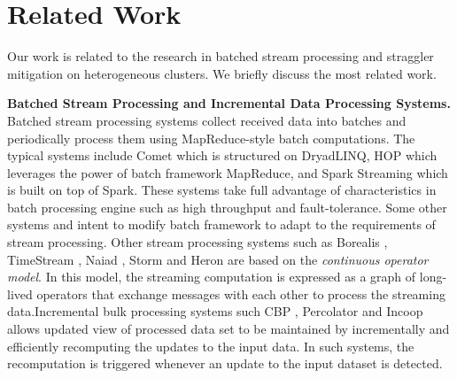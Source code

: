 \documentclass[10pt,conference,compsocconf,letterpaper]{IEEEtran}
\begin{document}
\section{Related Work}

  Our work is related to the research in batched stream processing and straggler mitigation on heterogeneous clusters. We briefly discuss the most related work.

  \textbf{Batched Stream Processing and Incremental Data Processing Systems.} Batched stream processing systems collect received data into batches and periodically process them using MapReduce-style batch computations. The typical systems include Comet \cite{He2010} which is structured on DryadLINQ, HOP \cite{Condie2010} which leverages the power of batch framework MapReduce, and Spark Streaming \cite{Zaharia2013} which is built on top of Spark. These systems take full advantage of characteristics in batch processing engine such as high throughput and fault-tolerance. Some other systems \cite{Li2011} and \cite{Lam2012} intent to modify batch framework to adapt to the requirements of stream processing. Other stream processing systems such as Borealis \cite{Abadi2005}, TimeStream \cite{Qian2013}, Naiad \cite{Murray2013}, Storm \cite{Toshniwal2014} and Heron \cite{Kulkarni2015} are based on the \emph{continuous operator model}. In this model, the streaming computation is expressed as a graph of long-lived operators that exchange messages with each other to process the streaming data.Incremental bulk processing systems such CBP \cite{Logothetis2010}, Percolator \cite{Peng2010} and Incoop \cite{Bhatotia2011a} allows updated view of processed data set to be maintained by incrementally and efficiently recomputing the updates to the input data. In such systems, the recomputation is triggered whenever an update to the input dataset is detected.
\end{document}

